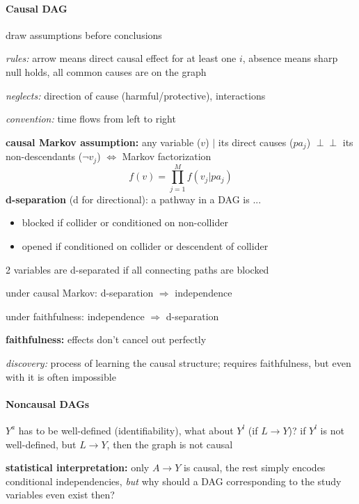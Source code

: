 \documentclass[8pt,twoside]{extarticle}
\newcommand{\indep}{\perp \!\!\! \perp}
\begin{document}
\begin{multicols}{2}
\paragraph{Causal DAG} draw assumptions before conclusions


 \textit{rules:}
arrow means direct causal effect for at least one $i$, absence means sharp null holds, all common causes are on the graph


 \textit{neglects:} direction of cause (harmful/protective), interactions

 \textit{convention:} time flows from left to right


 \textbf{causal Markov assumption:} any variable ($v$) $|$ its direct causes ($pa_j$) $\indep$ its non-descendants ($\lnot v_j$) $\Leftrightarrow$ Markov factorization $$f(v) = \textstyle\prod_{j=1}^Mf(v_j|pa_j)$$
 \textbf{d-separation} (d for directional): a pathway in a DAG is ...
\begin{itemize}[itemsep=0em, topsep=0pt, partopsep=0pt,parsep=0pt, leftmargin=1.5em]
\setlength{\itemsep}{0pt}%
\setlength{\parskip}{0pt}
\item blocked if collider or conditioned on non-collider
\item opened if conditioned on collider or descendent of collider
\end{itemize}
2 variables are d-separated if all connecting paths are blocked

 under causal Markov: d-separation $\Rightarrow$ independence

 under faithfulness: independence $\Rightarrow$ d-separation

 \textbf{faithfulness:} effects don't cancel out perfectly

 \textit{discovery:} process of learning the causal structure; requires faithfulness, but even with it is often impossible


\paragraph{Noncausal DAGs} \citep{hernan2023causal}
$Y^a$ has to be well-defined (identifiability), what about $Y^l$ (if $L\to Y$)? \newline
if $Y^l$ is not well-defined, but $L \to Y$, then the graph is not causal

 \textbf{statistical interpretation:} only $A\to Y$ is causal, the rest simply encodes conditional independencies, \textit{but} why should a DAG corresponding to the study variables even exist then?


\end{multicols}
\end{document}
